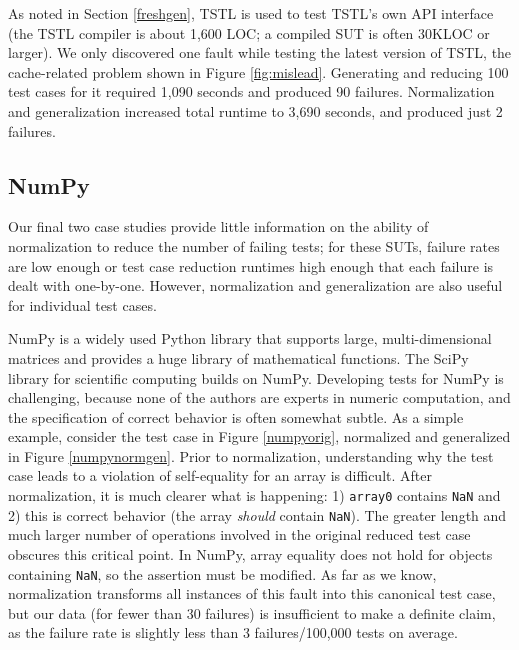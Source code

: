 As noted in Section \ref{freshgen}, TSTL is used to test TSTL's own
API interface (the TSTL compiler is about 1,600 LOC; a compiled SUT is
often 30KLOC or larger).  We only discovered one fault while testing
the latest version of TSTL, the cache-related problem shown in Figure \ref{fig:mislead}.
Generating and reducing 100 test cases for it required 1,090 seconds
and produced 90 failures.  Normalization and generalization
increased total runtime to 3,690 seconds, and produced just 2 failures.

\subsection{NumPy}

Our final two case studies provide little information on the ability
of normalization to reduce the number of failing tests; for these
SUTs, failure rates are low enough or test case reduction runtimes high
enough that each failure is dealt with one-by-one.  However,
normalization and generalization are also useful for
individual test cases.

NumPy \cite{NumPy} is a widely used Python library that
supports large, multi-dimensional matrices and provides a huge library
of mathematical functions.  The SciPy library for scientific
computing builds on NumPy.  Developing tests for NumPy is challenging,
because none of the authors are experts in numeric computation, and
the specification of correct behavior is often somewhat subtle.  As a
simple example, consider the test case in Figure \ref{numpyorig},
normalized and generalized in Figure \ref{numpynormgen}.  Prior to
normalization, understanding why the test case leads to a violation of
self-equality for an array is difficult.  After
normalization, it is much clearer what is happening: 1) {\tt array0}
contains {\tt NaN} and 2) this is correct behavior (the array
\emph{should} contain {\tt NaN}).  The greater length and much larger
number of operations involved in the original reduced test case
obscures this critical point.  In NumPy, array equality does not hold
for objects containing {\tt NaN}, so the assertion must be modified.
As far as we know, normalization transforms all instances of this
fault into this canonical test case, but our data (for fewer than 30
failures) is insufficient to make a definite claim, as the failure rate
is slightly less than 3 failures/100,000 tests on average.

